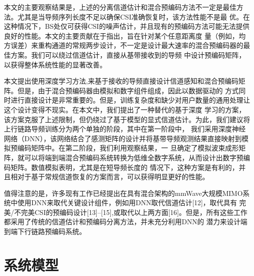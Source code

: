 \documentclass[10pt,journal,final]{IEEEtran}%
\begin{document}
本文的主要观察结果是，上述的分离信道估计和混合预编码方法不一定是最佳方法。尤其是当导频序列长度不足以确保CSI准确恢复时，该方法性能不是最
优。在这种情况下，BS处仅可获得CSI的噪声估计，并且现有的预编码方法可能无法提供良好的性能。本文的主要贡献在于指出，旨在针对某个任意距离度
量（例如，均方误差）来重构通道的常规两步设计，不一定是设计最大速率的混合预编码器的最佳方案。我们可以绕过信道估计，直接从基带接收到的导频
中设计预编码矩阵，以获得整体系统性能的显著改善。

本文提出使用深度学习方法,来基于接收的导频直接设计信道感知和混合预编码矩阵。但是，由于混合预编码器由模拟和数字组件组成，因此以数据驱动的
方式同时进行直接设计是非常重要的。但是，训练复杂度和缺少对用户数量的通用处理让这个设计变得不现实。在本文中，我们提出了一种替代的基于深度
学习的方案，该方案克服了上述限制，但仍绕过了基于模型的显式信道估计。为此，我们建议将上行链路导频训练分为两个单独的阶段，其中在第一阶段中，
我们采用深度神经网络（DNN），该网络结合了感测矩阵的设计并将基带导频观测结果直接映射到模拟预编码矩阵中。在第二阶段，我们利用观察结果，一
旦确定了模拟波束成形矩阵，就可以将端到端混合预编码系统转换为低维全数字系统，从而设计出数字预编码矩阵。数值模拟表明，尤其是在短导频长度的
情况下，这种方案是有利的，并且相对于基于常规信道恢复的方案而言，可以获得明显更好的性能。

值得注意的是，许多现有工作已经提出在具有混合架构的mmWave大规模MIMO系统中使用DNN来取代关键设计组件，例如用DNN取代信道估计[12]，取代具有
完美/不完美CSI的预编码设计[13]–[15],或取代以上两方面[16]。但是，所有这些工作都采用了传统的信道估计和预编码分离方法，并未充分利用DNN的
潜力来设计端到端下行链路预编码系统。
\vspace{-0.8em}
\section{系统模型} %
\vspace{-0.8em}
\end{document}
